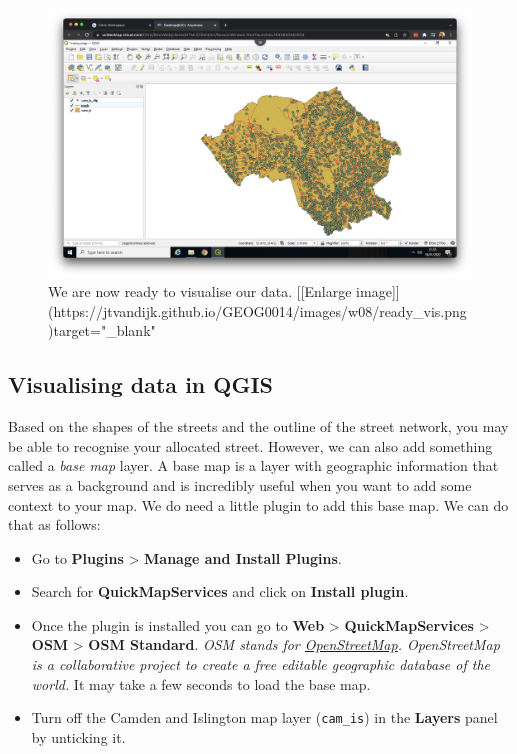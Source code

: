 \documentclass[
]{book}
\providecommand{\tightlist}{%
  \setlength{\itemsep}{0pt}\setlength{\parskip}{0pt}}
\begin{document}
\begin{figure}

{\centering \includegraphics[width=850pt]{images/w08/ready_vis} 

}

\caption{We are now ready to visualise our data. [[Enlarge image]](https://jtvandijk.github.io/GEOG0014/images/w08/ready_vis.png){target="_blank"}}\label{fig:ready-4-vis}
\end{figure}

\hypertarget{visualising-data-in-qgis}{%
\subsection*{Visualising data in QGIS}\label{visualising-data-in-qgis}}

Based on the shapes of the streets and the outline of the street network, you may be able to recognise your allocated street. However, we can also add something called a \emph{base map} layer. A base map is a layer with geographic information that serves as a background and is incredibly useful when you want to add some context to your map. We do need a little plugin to add this base map. We can do that as follows:

\begin{itemize}
\tightlist
\item
  Go to \textbf{Plugins} \textgreater{} \textbf{Manage and Install Plugins}.
\item
  Search for \textbf{QuickMapServices} and click on \textbf{Install plugin}.
\item
  Once the plugin is installed you can go to \textbf{Web} \textgreater{} \textbf{QuickMapServices} \textgreater{} \textbf{OSM} \textgreater{} \textbf{OSM Standard}. \emph{OSM stands for \href{https://www.openstreetmap.org/\#map=6/54.910/-3.432}{OpenStreetMap}. OpenStreetMap is a collaborative project to create a free editable geographic database of the world.} It may take a few seconds to load the base map.
\item
  Turn off the Camden and Islington map layer (\texttt{cam\_is}) in the \textbf{Layers} panel by unticking it.
\end{itemize}
\end{document}
